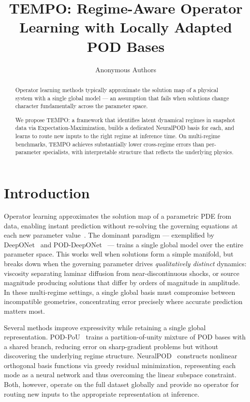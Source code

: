 \documentclass{article}
\title{TEMPO: Regime-Aware Operator Learning with Locally Adapted POD Bases}
\author{Anonymous Authors}
\begin{document}
\maketitle

\begin{abstract}
Operator learning methods typically approximate the solution map of a physical system with a single global model — an assumption that fails when solutions change character fundamentally across the parameter space.

We propose TEMPO: a framework that identifies latent dynamical regimes in snapshot data via Expectation-Maximization, builds a dedicated NeuralPOD basis for each, and learns to route new inputs to the right regime at inference time. On multi-regime benchmarks, TEMPO achieves substantially lower cross-regime errors than per-parameter specialists, with interpretable structure that reflects the underlying physics.

\end{abstract}

\section{Introduction}\label{sec:intro}

Operator learning approximates the solution map of a parametric PDE from data,
enabling instant prediction without re-solving the governing equations at each
new parameter value~\cite{Kovachki2024}.
The dominant paradigm — exemplified by DeepONet~\cite{Lu2019} and
POD-DeepONet~\cite{Lu2022} — trains a single global model over the entire
parameter space.
This works well when solutions form a simple manifold, but breaks down when
the governing parameter drives \emph{qualitatively distinct} dynamics:
viscosity separating laminar diffusion from near-discontinuous shocks, or source
magnitude producing solutions that differ by orders of magnitude in amplitude.
In these multi-regime settings, a single global basis must compromise between
incompatible geometries, concentrating error precisely where accurate prediction
matters most.

Several methods improve expressivity while retaining a single global
representation.
POD-PoU~\cite{Sharma2025} trains a partition-of-unity mixture of POD bases
with a shared branch, reducing error on sharp-gradient problems but without
discovering the underlying regime structure.
NeuralPOD~\cite{Mou2026} constructs nonlinear orthogonal basis functions via
greedy residual minimization, representing each mode as a neural network and
thus overcoming the linear subspace constraint.
Both, however, operate on the full dataset globally and provide no operator
for routing new inputs to the appropriate representation at inference.
\end{document}

